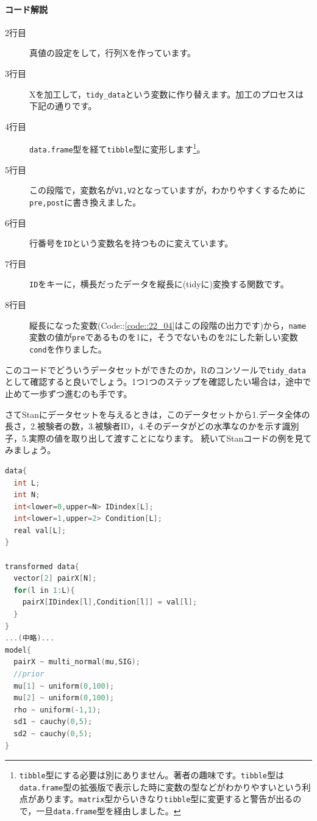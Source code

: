 \documentclass{ltjsbook}
\begin{document}
\paragraph{コード解説}
\begin{description}
    \item[2行目] 真値の設定をして，行列Xを作っています。
    \item[3行目] Xを加工して，\verb|tidy_data|という変数に作り替えます。加工のプロセスは下記の通りです。
    \item[4行目] \verb|data.frame|型を経て\verb|tibble|型に変形します\footnote{\verb|tibble|型にする必要は別にありません。著者の趣味です。\verb|tibble|型は\verb|data.frame|型の拡張版で表示した時に変数の型などがわかりやすいという利点があります。\verb|matrix|型からいきなり\verb|tibble|型に変更すると警告が出るので，一旦\verb|data.frame|型を経由しました。}。
    \item[5行目] この段階で，変数名が\verb|V1,V2|となっていますが，わかりやすくするために\verb|pre,post|に書き換えました。
    \item[6行目] 行番号を\verb|ID|という変数名を持つものに変えています。
    \item[7行目] \verb|ID|をキーに，横長だったデータを縦長に(tidyに)変換する関数です。
    \item[8行目] 縦長になった変数(Code::\ref{code::22_04}はこの段階の出力です)から，\verb|name|変数の値が\verb|pre|であるものを1に，そうでないものを2にした新しい変数\verb|cond|を作りました。 
\end{description}
このコードでどういうデータセットができたのか，Rのコンソールで\verb|tidy_data|として確認すると良いでしょう。1つ1つのステップを確認したい場合は，途中で止めて一歩ずつ進むのも手です。

さてStanにデータセットを与えるときは，このデータセットから1.データ全体の長さ，2.被験者の数，3.被験者ID，4.そのデータがどの水準なのかを示す識別子，5.実際の値を取り出して渡すことになります。
続いてStanコードの例を見てみましょう。

\begin{lstlisting}[language=C++,label={stan::22_03},caption={整然データ対応番}]
data{
  int L;
  int N;
  int<lower=0,upper=N> IDindex[L];
  int<lower=1,upper=2> Condition[L];
  real val[L];
}

transformed data{
  vector[2] pairX[N];
  for(l in 1:L){
    pairX[IDindex[l],Condition[l]] = val[l];
  }
}
...(中略)...
model{
  pairX ~ multi_normal(mu,SIG);
  //prior
  mu[1] ~ uniform(0,100);
  mu[2] ~ uniform(0,100);
  rho ~ uniform(-1,1);
  sd1 ~ cauchy(0,5);
  sd2 ~ cauchy(0,5);
}

\end{lstlisting}
\end{document}
